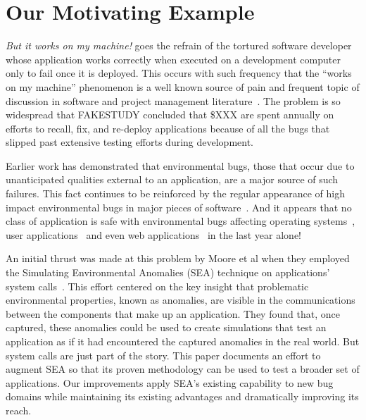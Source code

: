 \section{Our Motivating Example}
\label{SEC:background}

\textit{But it works on my machine!} goes the refrain of the tortured
software developer whose application works correctly when executed on a
development computer only to fail once it is deployed.  This occurs with
such frequency that the ``works on my machine'' phenomenon is a well known
source of pain
and frequent topic of discussion
in software and project management
literature~\cite{notreal}.
The problem is so widespread
that FAKESTUDY concluded
that \$XXX are spent annually on efforts to
recall,
fix,
and re-deploy applications
because of all the bugs
that slipped past extensive testing efforts
during development.

Earlier work has demonstrated that environmental bugs, those that occur due
to unanticipated qualities external to an application, are a major source
of such failures.  This fact continues to be reinforced by the regular
appearance of high impact environmental bugs in major pieces of
software~\cite{devzeroroot}.  And it appears that no class of application
is safe with environmental bugs affecting operating systems~\cite{bad},
user applications~\cite{bad} and even web applications~\cite{bad} in the
last year alone!

An initial thrust was made at this problem by Moore et al
when they employed
the Simulating Environmental Anomalies (SEA) technique
on applications' system calls~\cite{crashsim}.
This effort centered on the key insight
that problematic
environmental properties,
known as anomalies, are visible in the
communications between the components that make up an application.
They found that,
once captured,
these anomalies
could be
used to create simulations
that test
an application as if
it had encountered the captured anomalies
in the real world.
But system calls are just part of the story.
This paper documents an effort to augment SEA
so that its proven methodology
can be used to test a broader set of applications.
Our improvements
apply SEA's existing capability
to new bug domains
while maintaining its existing advantages and
dramatically
improving its reach.


